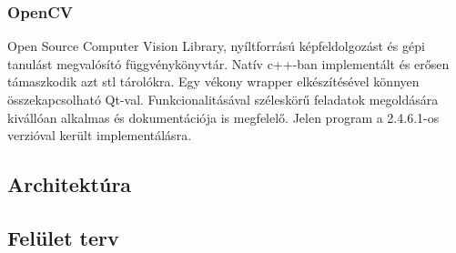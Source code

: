 \documentclass[a4paper,12pt,oneside]{report}
\begin{document}
\subsubsection{OpenCV}	
Open Source Computer Vision Library, nyíltforrású képfeldolgozást és gépi tanulást megvalósító függvénykönyvtár. Natív c++-ban implementált és erősen támaszkodik azt stl tárolókra. Egy vékony wrapper elkészítésével könnyen összekapcsolható Qt-val. Funkcionalitásával széleskörű feladatok megoldására kivállóan alkalmas és dokumentációja is megfelelő. Jelen program a 2.4.6.1-os verzióval került implementálásra.


\subsection{Architektúra}

\subsection{Felület terv}

%
%
\end{document}
